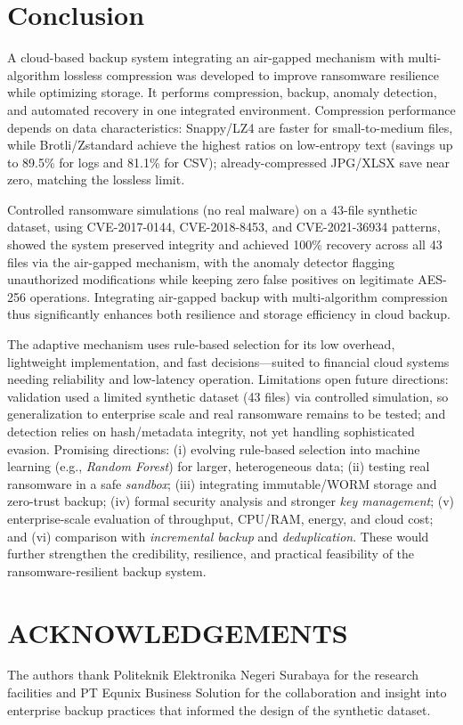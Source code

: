 \documentclass{iaesarticle}
\begin{document}
\section{Conclusion}
\label{sec:conclusion}
A cloud-based backup system integrating an air-gapped mechanism with multi-algorithm lossless compression was developed to improve ransomware resilience while optimizing storage. It performs compression, backup, anomaly detection, and automated recovery in one integrated environment. Compression performance depends on data characteristics: Snappy/LZ4 are faster for small-to-medium files, while Brotli/Zstandard achieve the highest ratios on low-entropy text (savings up to 89.5\% for logs and 81.1\% for CSV); already-compressed JPG/XLSX save near zero, matching the lossless limit.

Controlled ransomware simulations (no real malware) on a 43-file synthetic dataset, using CVE-2017-0144, CVE-2018-8453, and CVE-2021-36934 patterns, showed the system preserved integrity and achieved 100\% recovery across all 43 files via the air-gapped mechanism, with the anomaly detector flagging unauthorized modifications while keeping zero false positives on legitimate AES-256 operations. Integrating air-gapped backup with multi-algorithm compression thus significantly enhances both resilience and storage efficiency in cloud backup.

The adaptive mechanism uses rule-based selection for its low overhead, lightweight implementation, and fast decisions---suited to financial cloud systems needing reliability and low-latency operation. Limitations open future directions: validation used a limited synthetic dataset (43 files) via controlled simulation, so generalization to enterprise scale and real ransomware remains to be tested; and detection relies on hash/metadata integrity, not yet handling sophisticated evasion. Promising directions: (i) evolving rule-based selection into machine learning (e.g., \textit{Random Forest}) for larger, heterogeneous data; (ii) testing real ransomware in a safe \textit{sandbox}; (iii) integrating immutable/WORM storage and zero-trust backup; (iv) formal security analysis and stronger \textit{key management}; (v) enterprise-scale evaluation of throughput, CPU/RAM, energy, and cloud cost; and (vi) comparison with \textit{incremental backup} and \textit{deduplication}. These would further strengthen the credibility, resilience, and practical feasibility of the ransomware-resilient backup system.

\section*{ACKNOWLEDGEMENTS}
\label{sec:ack}
The authors thank Politeknik Elektronika Negeri Surabaya for the research facilities and PT Equnix Business Solution for the collaboration and insight into enterprise backup practices that informed the design of the synthetic dataset.
\end{document}
